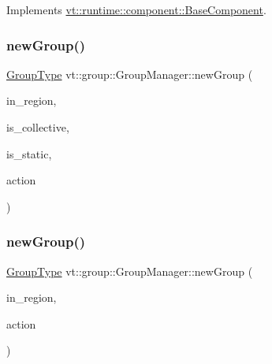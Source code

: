 Implements \hyperlink{structvt_1_1runtime_1_1component_1_1_base_component_a7701485f3539f78d42e6bad47fc7eb78}{vt\+::runtime\+::component\+::\+Base\+Component}.

\mbox{\label{structvt_1_1group_1_1_group_manager_aaf9941faced23021a420185203219149}} 
\subsubsection{\texorpdfstring{new\+Group()}{newGroup()}\hspace{0.1cm}{\footnotesize\ttfamily [1/2]}}
{\footnotesize\ttfamily \hyperlink{namespacevt_a27b5e4411c9b6140c49100e050e2f743}{Group\+Type} vt\+::group\+::\+Group\+Manager\+::new\+Group (\begin{DoxyParamCaption}\item[{\hyperlink{structvt_1_1group_1_1_group_manager_a9192e585fc2f99bfd5a6ff65fc21c40b}{Region\+Ptr\+Type}}]{in\+\_\+region,  }\item[{bool const \&}]{is\+\_\+collective,  }\item[{bool const \&}]{is\+\_\+static,  }\item[{\hyperlink{structvt_1_1group_1_1_group_manager_ae871c5871ad62b530220009c1ee4d4b9}{Action\+Group\+Type}}]{action }\end{DoxyParamCaption})}

\mbox{\label{structvt_1_1group_1_1_group_manager_af2986f6eacd693d9906cb397e6e2a706}} 
\subsubsection{\texorpdfstring{new\+Group()}{newGroup()}\hspace{0.1cm}{\footnotesize\ttfamily [2/2]}}
{\footnotesize\ttfamily \hyperlink{namespacevt_a27b5e4411c9b6140c49100e050e2f743}{Group\+Type} vt\+::group\+::\+Group\+Manager\+::new\+Group (\begin{DoxyParamCaption}\item[{\hyperlink{structvt_1_1group_1_1_group_manager_a9192e585fc2f99bfd5a6ff65fc21c40b}{Region\+Ptr\+Type}}]{in\+\_\+region,  }\item[{\hyperlink{structvt_1_1group_1_1_group_manager_ae871c5871ad62b530220009c1ee4d4b9}{Action\+Group\+Type}}]{action }\end{DoxyParamCaption})}

